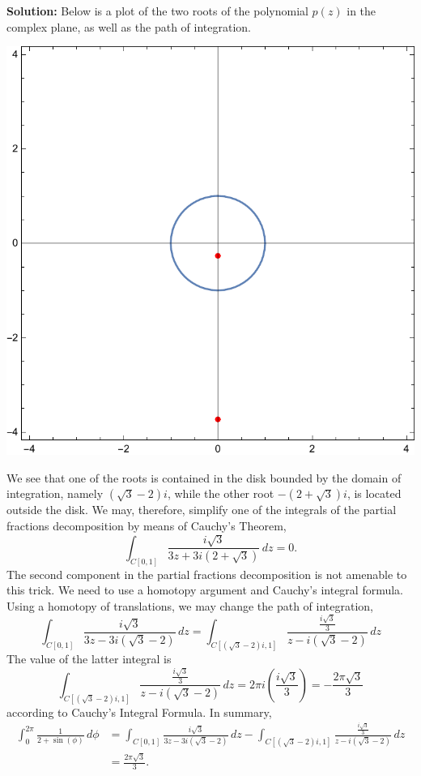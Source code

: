 \documentclass[12pt,oneside]{exam}
\begin{document}
\noindent \textbf{Solution:} Below is a plot of the two roots of the polynomial $p(z)$ in the complex plane, as well as the path of integration. 
\begin{center}
\includegraphics[scale=0.4]{p3.pdf}
\end{center}
We see that one of the roots is contained in the disk bounded by the domain of integration, namely $(\sqrt{3}-2)i$, while the other root $-(2+\sqrt{3})i$, is located outside the disk. We may, therefore, simplify one of the integrals of the partial fractions decomposition by means of Cauchy's Theorem, 
\begin{equation*}
\int_{C[0,1]} \frac{i\sqrt{3}}{3z+3i(2+\sqrt{3})}\, dz = 0.
\end{equation*}
The second component in the partial fractions decomposition is not amenable to this trick. We need to use a homotopy argument and Cauchy's integral formula. Using a homotopy of translations, we may change the path of integration, 
\begin{equation*}
\int_{C[0,1]} \frac{i\sqrt{3}}{3z-3i(\sqrt{3}-2)}\, dz = \int_{C[(\sqrt{3}-2)i,1]} \frac{\frac{i\sqrt{3}}{3}}{z-i(\sqrt{3}-2)}\, dz
\end{equation*}
The value of the latter integral is
\begin{equation*}
\int_{C[(\sqrt{3}-2)i,1]} \frac{\frac{i\sqrt{3}}{3}}{z-i(\sqrt{3}-2)}\, dz = 2\pi i \left(\frac{i\sqrt{3}}{3}\right) = -\frac{2\pi \sqrt{3}}{3}
\end{equation*}
 according to Cauchy's Integral Formula. In summary,
 \begin{align*}
\int_{0}^{2\pi} \frac{1}{2+\sin(\phi)}\, d\phi & = \int_{C[0,1]} \frac{i\sqrt{3}}{3z-3i(\sqrt{3}-2)}\, dz - \int_{C[(\sqrt{3}-2)i,1]} \frac{\frac{i\sqrt{3}}{3}}{z-i(\sqrt{3}-2)}\, dz \\
& = \frac{2\pi \sqrt{3}}{3}.
 \end{align*}
\end{document}
